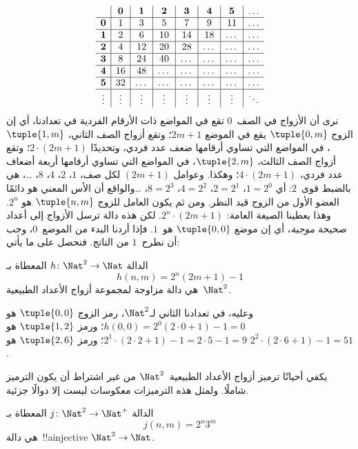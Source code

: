 \documentclass[../../../include/open-logic-section]{subfiles}
\begin{document}
\begin{explain}
\[
\begin{array}{ c | c | c | c | c | c | c | c }
& \mathbf 0 & \mathbf 1 & \mathbf 2 & \mathbf 3 & \mathbf 4 & \mathbf 5 & \dots \\
\hline
\mathbf 0 & 1 & 3 & 5 & 7 & 9 & 11 & \dots \\
\hline
\mathbf 1 & 2 & 6 & 10 & 14 & 18 & \dots & \dots \\
\hline
\mathbf 2 & 4 & 12 & 20 & 28 & \dots & \dots & \dots \\
\hline
\mathbf 3 & 8 & 24 & 40 & \dots & \dots & \dots & \dots \\
\hline
\mathbf 4 & 16 & 48 & \dots & \dots & \dots & \dots & \dots \\
\hline
\mathbf 5 & 32 & \dots & \dots & \dots & \dots & \dots & \dots \\
\hline
\vdots & \vdots & \vdots & \vdots & \vdots & \vdots & \vdots & \ddots\\
\end{array}
\]
نرى أن الأزواج في الصف~$0$ تقع في المواضع ذات الأرقام الفردية في
تعدادنا، أي إن الزوج $\tuple{0,m}$ يقع في الموضع $2m+1$؛ وتقع أزواج
الصف الثاني، $\tuple{1,m}$، في المواضع التي تساوي أرقامها ضعف عدد
فردي، وتحديدًا $2 \cdot (2m+1)$؛ وتقع أزواج الصف الثالث،
$\tuple{2,m}$، في المواضع التي تساوي أرقامها أربعة أضعاف عدد فردي،
$4 \cdot (2m+1)$؛ وهكذا. وعوامل $(2m+1)$ لكل صف، $1$، $2$، $4$،
$8$، \dots، هي بالضبط قوى~$2$: أي $1= 2^0$، $2 = 2^1$،
$4 = 2^2$، $8 = 2^3$، \dots\@ والواقع أن الأس المعني هو دائمًا
العضو الأول من الزوج قيد النظر. ومن ثم يكون العامل للزوج
$\tuple{n,m}$ هو $2^n$. وهذا يعطينا الصيغة العامة:
$2^n \cdot (2m+1)$. لكن هذه دالة ترسل الأزواج إلى أعداد صحيحة
\emph{موجبة}، أي إن موضع $\tuple{0,0}$ هو~$1$. فإذا أردنا البدء من
الموضع~$0$، وجب أن نطرح~$1$ من الناتج. فنحصل على ما يأتي:
\end{explain}

\begin{ex}
الدالة $h\colon \Nat^2 \to \Nat$ المعطاة بـ
\[
h(n,m) = 2^n (2m+1) - 1
\]
هي دالة مزاوجة لمجموعة أزواج الأعداد الطبيعية~$\Nat^2$.
\end{ex}

\begin{explain}
وعليه، في تعدادنا الثاني لـ$\Nat^2$، رمز الزوج
$\tuple{0,0}$ هو $h(0,0) = 2^0(2\cdot 0+1) - 1 = 0$؛
ورمز $\tuple{1,2}$ هو $2^{1} \cdot (2 \cdot 2 + 1) - 1 = 2
\cdot 5 - 1 = 9$؛ ورمز $\tuple{2,6}$ هو $2^{2} \cdot (2
\cdot 6 + 1) - 1 = 51$.
\end{explain}

يكفي أحيانًا ترميز أزواج الأعداد الطبيعية~$\Nat^2$ من غير اشتراط
أن يكون الترميز شاملًا. ولمثل هذه الترميزات معكوسات ليست إلا دوالًا
جزئية.

\begin{ex}
الدالة $j\colon \Nat^2 \to \Nat^+$ المعطاة بـ
\[
j(n,m) = 2^n3^m
\]
هي دالة~!!a{injective} $\Nat^2 \to \Nat$.
\end{ex}
\end{document}
